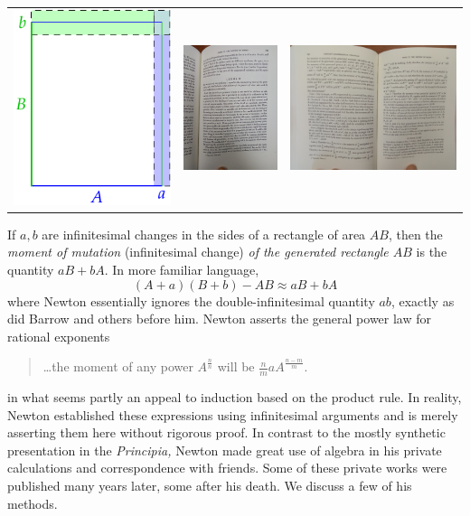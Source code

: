 \begin{center}
\begin{tabular}{ccc}
\includegraphics{newton-prodrule}
&
\includegraphics[height=140pt]{newton8.jpg}
&
\includegraphics[height=140pt]{newton9.jpg}
\end{tabular}
\end{center}

If $a,b$ are infinitesimal changes in the sides of a rectangle of area $AB$, then the \emph{moment of mutation} (infinitesimal change) \emph{of the generated rectangle $AB$} is the quantity $aB+bA$. In more familiar language,
\[(A+a)(B+b)-AB\approx aB+bA\]
where Newton essentially ignores the double-infinitesimal quantity $ab$, exactly as did Barrow and others before him. Newton asserts the general power law for rational exponents 
\begin{quote}
\ldots the moment of any power $\displaystyle A^{\frac nn}$ will be $\displaystyle\frac nmaA^{\frac{n-m}m}$.
\end{quote}
in what seems partly an appeal to induction based on the product rule. In reality, Newton established these expressions using infinitesimal arguments and is merely asserting them here without rigorous proof. In contrast to the mostly synthetic presentation in the \emph{Principia,} Newton made great use of algebra in his private calculations and correspondence with friends. Some of these private works were published many years later, some after his death. We discuss a few of his methods.

